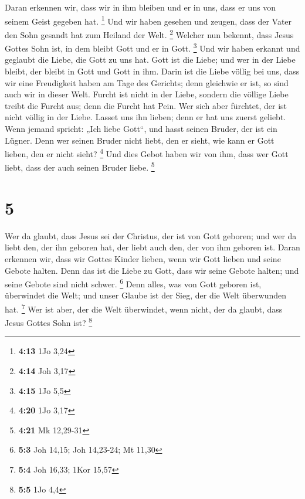  Daran erkennen wir, dass wir in ihm bleiben und er in
uns, dass er uns von seinem Geist gegeben hat. \footnote{\textbf{4:13}
  1Jo 3,24}  Und wir haben gesehen und zeugen, dass der
Vater den Sohn gesandt hat zum Heiland der Welt. \footnote{\textbf{4:14}
  Joh 3,17}  Welcher nun bekennt, dass Jesus Gottes Sohn
ist, in dem bleibt Gott und er in Gott. \footnote{\textbf{4:15} 1Jo 5,5}
 Und wir haben erkannt und geglaubt die Liebe, die Gott
zu uns hat. Gott ist die Liebe; und wer in der Liebe bleibt, der bleibt
in Gott und Gott in ihm.  Darin ist die Liebe völlig bei
uns, dass wir eine Freudigkeit haben am Tage des Gerichts; denn
gleichwie er ist, so sind auch wir in dieser Welt. 
Furcht ist nicht in der Liebe, sondern die völlige Liebe treibt die
Furcht aus; denn die Furcht hat Pein. Wer sich aber fürchtet, der ist
nicht völlig in der Liebe.  Lasset uns ihn lieben; denn
er hat uns zuerst geliebt.  Wenn jemand spricht: „Ich
liebe Gott``, und hasst seinen Bruder, der ist ein Lügner. Denn wer
seinen Bruder nicht liebt, den er sieht, wie kann er Gott lieben, den er
nicht sieht? \footnote{\textbf{4:20} 1Jo 3,17}  Und dies
Gebot haben wir von ihm, dass wer Gott liebt, dass der auch seinen
Bruder liebe. \footnote{\textbf{4:21} Mk 12,29-31}

\hypertarget{section-4}{%
\section{5}\label{section-4}}

 Wer da glaubt, dass Jesus sei der Christus, der ist von
Gott geboren; und wer da liebt den, der ihn geboren hat, der liebt auch
den, der von ihm geboren ist.  Daran erkennen wir, dass
wir Gottes Kinder lieben, wenn wir Gott lieben und seine Gebote halten.
 Denn das ist die Liebe zu Gott, dass wir seine Gebote
halten; und seine Gebote sind nicht schwer. \footnote{\textbf{5:3} Joh
  14,15; Joh 14,23-24; Mt 11,30}  Denn alles, was von Gott
geboren ist, überwindet die Welt; und unser Glaube ist der Sieg, der die
Welt überwunden hat. \footnote{\textbf{5:4} Joh 16,33; 1Kor 15,57}
 Wer ist aber, der die Welt überwindet, wenn nicht, der da
glaubt, dass Jesus Gottes Sohn ist? \footnote{\textbf{5:5} 1Jo 4,4}

